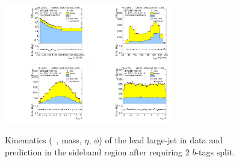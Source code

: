 \clearpage

\begin{figure}[htbp!]
\begin{center}
\includegraphics[width=0.32\textwidth,angle=-90]{figures/boosted/Sideband/b77_TwoTag_split_Sideband_leadHCand_Pt_m_1.pdf}
\includegraphics[width=0.32\textwidth,angle=-90]{figures/boosted/Sideband/b77_TwoTag_split_Sideband_leadHCand_Mass_s.pdf}\\
\includegraphics[width=0.32\textwidth,angle=-90]{figures/boosted/Sideband/b77_TwoTag_split_Sideband_leadHCand_Eta.pdf}
\includegraphics[width=0.32\textwidth,angle=-90]{figures/boosted/Sideband/b77_TwoTag_split_Sideband_leadHCand_Phi.pdf}
  \caption{Kinematics (\pt~, mass, $\eta$, $\phi$) of the lead large-\R jet in data and prediction in the sideband region after requiring 2 $b$-tags split.}
  \label{fig:boosted-2bs-sideband-ak10-lead}
\end{center}
\end{figure}

